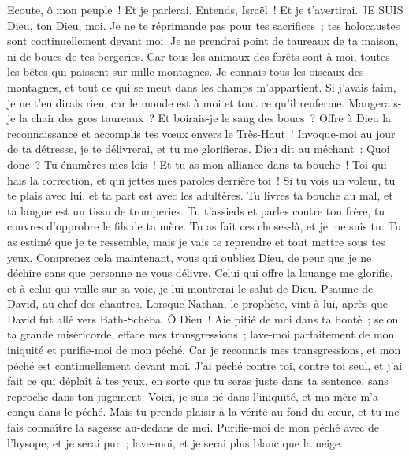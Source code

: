 \begin{multicols}{2}
Ecoute, ô mon peuple~! Et je parlerai. Entends, Israël~! Et je t'avertirai. JE SUIS Dieu, ton Dieu, moi.
Je ne te réprimande pas pour tes sacrifices~; tes holocaustes sont continuellement devant moi.
Je ne prendrai point de taureaux de ta maison, ni de boucs de tes bergeries.
Car tous les animaux des forêts sont à moi, toutes les bêtes qui paissent sur mille montagnes.
Je connais tous les oiseaux des montagnes, et tout ce qui se meut dans les champs m'appartient.
Si j'avais faim, je ne t'en dirais rien, car le monde est à moi et tout ce qu'il renferme.
Mangerais-je la chair des gros taureaux~? Et boirais-je le sang des boucs~?
Offre à Dieu la reconnaissance et accomplis tes vœux envers le Très-Haut~!
Invoque-moi au jour de ta détresse, je te délivrerai, et tu me glorifieras.
Dieu dit au méchant~: Quoi donc~? Tu énumères mes lois~! Et tu as mon alliance dans ta bouche~!
Toi qui hais la correction, et qui jettes mes paroles derrière toi~!
Si tu vois un voleur, tu te plais avec lui, et ta part est avec les adultères.
Tu livres ta bouche au mal, et ta langue est un tissu de tromperies.
Tu t'assieds et parles contre ton frère, tu couvres d'opprobre le fils de ta mère.
Tu as fait ces choses-là, et je me suis tu. Tu as estimé que je te ressemble, mais je vais te reprendre et tout mettre sous tes yeux.
Comprenez cela maintenant, vous qui oubliez Dieu, de peur que je ne déchire sans que personne ne vous délivre.
Celui qui offre la louange me glorifie, et à celui qui veille sur sa voie, je lui montrerai le salut de Dieu.
\VerseOne{}Psaume de David, au chef des chantres.
Lorsque Nathan, le prophète, vint à lui, après que David fut allé vers Bath-Schéba.
Ô Dieu~! Aie pitié de moi dans ta bonté~; selon ta grande miséricorde, efface mes transgressions~;
lave-moi parfaitement de mon iniquité et purifie-moi de mon péché.
Car je reconnais mes transgressions, et mon péché est continuellement devant moi.
J'ai péché contre toi, contre toi seul, et j'ai fait ce qui déplaît à tes yeux, en sorte que tu seras juste dans ta sentence, sans reproche dans ton jugement.
Voici, je suis né dans l'iniquité, et ma mère m'a conçu dans le péché.
Mais tu prends plaisir à la vérité au fond du cœur, et tu me fais connaître la sagesse au-dedans de moi.
Purifie-moi de mon péché avec de l'hysope, et je serai pur~; lave-moi, et je serai plus blanc que la neige.

\end{multicols}
